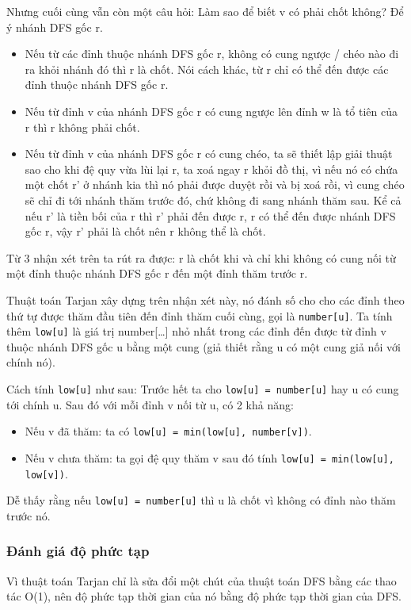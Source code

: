 Nhưng cuối cùng vẫn còn một câu hỏi: Làm sao để biết v có phải chốt không? Để ý nhánh DFS gốc r.
\begin{itemize}
    \item Nếu từ các đỉnh thuộc nhánh DFS gốc r, không có cung ngược / chéo nào đi ra khỏi nhánh đó thì r là chốt. Nói cách khác, từ r chỉ có thể đến được các đỉnh thuộc nhánh DFS gốc r.
    \item Nếu từ đỉnh v của nhánh DFS gốc r có cung ngược lên đỉnh w là tổ tiên của r thì r không phải chốt.
    \item Nếu từ đỉnh v của nhánh DFS gốc r có cung chéo, ta sẽ thiết lập giải thuật sao cho khi đệ quy vừa lùi lại r, ta xoá ngay r khỏi đồ thị, vì nếu nó có chứa một chốt r' ở nhánh kia thì nó phải được duyệt rồi và bị xoá rồi, vì cung chéo sẽ chỉ đi tới nhánh thăm trước đó, chứ không đi sang nhánh thăm sau. Kể cả nếu r' là tiền bối của r thì r' phải đến được r, r có thể đến được nhánh DFS gốc r, vậy r' phải là chốt nên r không thể là chốt.
\end{itemize}

Từ 3 nhận xét trên ta rút ra được: r là chốt khi và chỉ khi không có cung nối từ một đỉnh thuộc nhánh DFS gốc r đến một đỉnh thăm trước r.

Thuật toán Tarjan xây dựng trên nhận xét này, nó đánh số cho cho các đỉnh theo thứ tự được thăm đầu tiên đến đỉnh thăm cuối cùng, gọi là \texttt{number[u]}. Ta tính thêm \texttt{low[u]} là giá trị number[\dots] nhỏ nhất trong các đỉnh đến được từ đỉnh v thuộc nhánh DFS gốc u bằng một cung (giả thiết rằng u có một cung giả nối với chính nó).

Cách tính \texttt{low[u]} như sau: Trước hết ta cho \texttt{low[u] = number[u]} hay u có cung tới chính u. Sau đó với mỗi đỉnh v nối từ u, có 2 khả năng:
\begin{itemize}
    \item Nếu v đã thăm: ta có \texttt{low[u] = min(low[u], number[v])}.
    \item Nếu v chưa thăm: ta gọi đệ quy thăm v sau đó tính \texttt{low[u] = min(low[u], low[v])}.
\end{itemize}

Dễ thấy rằng nếu \texttt{low[u] = number[u]} thì u là chốt vì không có đỉnh nào thăm trước nó.

\subsubsection{Đánh giá độ phức tạp}
Vì thuật toán Tarjan chỉ là sửa đổi một chút của thuật toán DFS bằng các thao tác O(1), nên độ phức tạp thời gian của nó bằng độ phức tạp thời gian của DFS.

